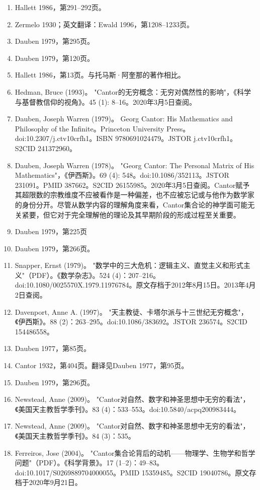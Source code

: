 \begin{enumerate}
\item Hallett 1986，第291–292页。
\item Zermelo 1930；英文翻译：Ewald 1996，第1208–1233页。
\item Dauben 1979，第295页。
\item Dauben 1979，第120页。
\item Hallett 1986，第13页。与托马斯·阿奎那的著作相比。
\item Hedman, Bruce (1993)。 "Cantor的无穷概念：无穷对偶然性的影响"，《科学与基督教信仰的视角》。45 (1): 8–16。2020年3月5日查阅。
\item Dauben, Joseph Warren (1979)。 Georg Cantor: His Mathematics and Philosophy of the Infinite。Princeton University Press。doi:10.2307/j.ctv10crfh1。ISBN 9780691024479。JSTOR j.ctv10crfh1。S2CID 241372960。
\item Dauben, Joseph Warren (1978)。 "Georg Cantor: The Personal Matrix of His Mathematics"，《伊西斯》。69 (4): 548。doi:10.1086/352113。JSTOR 231091。PMID 387662。S2CID 26155985。2020年3月5日查阅。Cantor赋予其超限数的宗教维度不应被看作是一种偏差，也不应被忘记或与他作为数学家的身份分开。尽管从数学内容的理解角度来看，Cantor集合论的神学面可能无关紧要，但它对于完全理解他的理论及其早期阶段的形成过程至关重要。
\item Dauben 1979，第225页
\item Dauben 1979，第266页。
\item Snapper, Ernst (1979)。 "数学中的三大危机：逻辑主义、直觉主义和形式主义"（PDF）。《数学杂志》。524 (4)：207–216。doi:10.1080/0025570X.1979.11976784。原文存档于2012年8月15日。2013年4月2日查阅。
\item Davenport, Anne A. (1997)。 "天主教徒、卡塔尔派与十三世纪无穷概念"，《伊西斯》。88 (2)：263–295。doi:10.1086/383692。JSTOR 236574。S2CID 154486558。
\item Dauben 1977，第85页。
\item Cantor 1932，第404页。翻译见Dauben 1977，第95页。
\item Dauben 1979，第296页。
\item Newstead, Anne (2009)。 "Cantor对自然、数字和神圣思想中无穷的看法"，《美国天主教哲学季刊》。83 (4)：533–553。doi:10.5840/acpq200983444。
\item Newstead, Anne (2009)。 "Cantor对自然、数字和神圣思想中无穷的看法"，《美国天主教哲学季刊》。84 (3)：535。
\item Ferreiros, Jose (2004)。 "Cantor集合论背后的动机——物理学、生物学和哲学问题"（PDF）。《科学背景》。17 (1–2)：49–83。doi:10.1017/S0269889704000055。PMID 15359485。S2CID 19040786。原文存档于2020年9月21日。

\end{enumerate}
